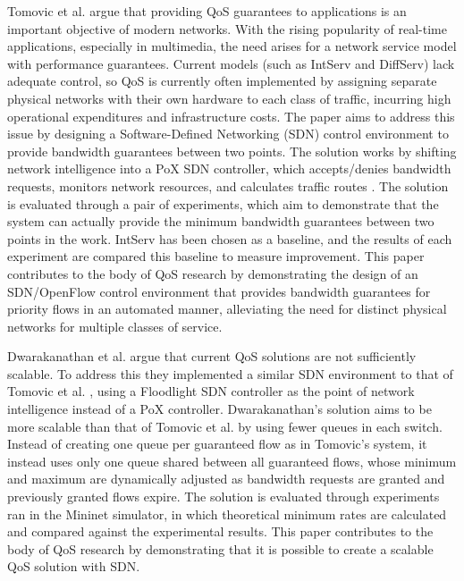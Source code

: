\documentclass[accepted,single]{gipaper}
\begin{document}
Tomovic et al. \cite{Tomovic:2014} argue that providing QoS guarantees to applications is an important objective of modern networks. With the rising popularity of real-time applications, especially in multimedia, the need arises for a network service model with performance guarantees. Current models (such as IntServ and DiffServ) lack adequate control, so QoS is currently often implemented by assigning separate physical networks with their own hardware to each class of traffic, incurring high operational expenditures and infrastructure costs. The paper aims to address this issue by designing a Software-Defined Networking (SDN) control environment to provide bandwidth guarantees between two points. The solution works by shifting network intelligence into a PoX SDN controller, which accepts/denies bandwidth requests, monitors network resources, and calculates traffic routes \cite{Tomovic:2014}. The solution is evaluated through a pair of experiments, which aim to demonstrate that the system can actually provide the minimum bandwidth guarantees between two points in the work. IntServ has been chosen as a baseline, and the results of each experiment are compared this baseline to measure improvement. This paper contributes to the body of QoS research by demonstrating the design of an SDN/OpenFlow control environment that provides bandwidth guarantees for priority flows in an automated manner, alleviating the need for distinct physical networks for multiple classes of service.


Dwarakanathan et al. \cite{Dwara:2015} argue that current QoS solutions are not sufficiently scalable. To address this they implemented a similar SDN environment to that of Tomovic et al. \cite{Tomovic:2014}, using a Floodlight SDN controller as the point of network intelligence instead of a PoX controller. Dwarakanathan's \cite{Dwara:2015} solution aims to be more scalable than that of Tomovic et al. \cite{Tomovic:2014} by using fewer queues in each switch. Instead of creating one queue per guaranteed flow as in Tomovic's \cite{Tomovic:2014} system, it instead uses only one queue shared between all guaranteed flows, whose minimum and maximum are dynamically adjusted as bandwidth requests are granted and previously granted flows expire. The solution is evaluated through experiments ran in the Mininet simulator, in which theoretical minimum rates are calculated and compared against the experimental results. This paper contributes to the body of QoS research by demonstrating that it is possible to create a scalable QoS solution with SDN.
\end{document}
